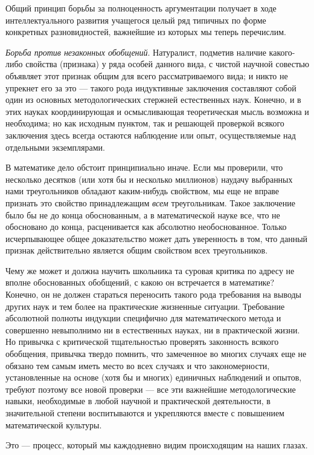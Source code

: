 \documentclass[12pt, a4paper, openany]{book}
\begin{document}
Общий принцип борьбы за полноценность аргументации получает в ходе интеллектуального развития учащегося целый ряд типичных по форме конкретных  разновидностей, важнейшие из которых мы теперь перечислим. 

\textit{Борьба против незаконных обобщений}. Натуралист, подметив наличие какого-либо свойства (признака) у ряда особей данного вида, с чистой научной совестью объявляет этот признак общим для всего рассматриваемого вида; и никто не упрекнет его за это — такого рода  индуктивные заключения составляют собой один из основных  методологических стержней естественных наук. Конечно, и в этих науках координирующая и осмысливающая  теоретическая мысль возможна и необходима; но как исходным пунктом, так и решающей проверкой всякого заключения здесь всегда остаются наблюдение или опыт,  осуществляемые над отдельными экземплярами. 

В математике дело обстоит принципиально иначе. Если мы проверили, что несколько десятков (или хотя бы и  несколько миллионов) наудачу выбранных нами  треугольников обладают каким-нибудь свойством, мы еще не вправе признать это свойство принадлежащим \textit{всем} треугольникам. Такое заключение было бы не до конца обоснованным, а в математической науке все, что не обосновано до  конца, расценивается как абсолютно необоснованное. Только исчерпывающее общее доказательство может дать  уверенность в том, что данный признак действительно является общим свойством всех треугольников. 

Чему же может и должна научить школьника та  суровая критика по адресу не вполне обоснованных обобщений, с какою он встречается в математике? Конечно, он не должен стараться переносить такого рода требования на выводы других наук и тем более на практические  жизненные ситуации. Требование абсолютной полноты индукции специфично для математического метода и совершенно невыполнимо ни в естественных науках, ни в  практической жизни. Но привычка с критической тщательностью проверять законность всякого обобщения, привычка  твердо помнить, что замеченное во многих случаях еще не  обязано тем самым иметь место во всех случаях и что  закономерности, установленные на основе (хотя бы и многих) единичных наблюдений и опытов, требуют поэтому все новой проверки — все эти важнейшие методологические навыки, необходимые в любой научной и практической  деятельности, в значительной степени воспитываются и  укрепляются вместе с повышением математической культуры. 

Это — процесс, который мы каждодневно видим  происходящим на наших глазах. 
\end{document}
